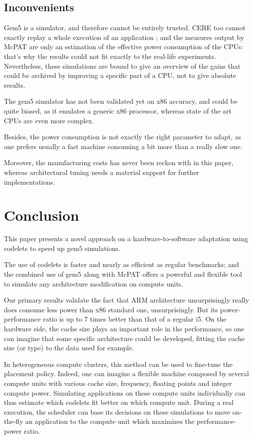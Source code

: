 \documentclass{article}
\begin{document}
\begin{multicols}{2}
\subsection{Inconvenients}
Gem5 is a simulator, and therefore cannot be entirely trusted. CERE too cannot exactly replay a whole execution of an application ; and the measures output by McPAT are only an estimation of the effective power consumption of the CPUs: that's why the results could not fit exactly to the real-life experiments. Nevertheless, these simulations are bound to give an overview of the gains that could be archived by improving a specific part of a CPU, not to give absolute results.

The gem5 simulator has not been validated yet on x86 accuracy, and could be quite biased, as it emulates a generic x86 processor, whereas state of the art CPUs are even more complex.

Besides, the power consumption is not exactly the right parameter to adapt, as one prefers usually a fast machine consuming a bit more than a really slow one.

Moreover, the manufacturing costs has never been reckon with in this paper, whereas architectural tuning needs a material support for further implementations. 


\section{Conclusion}
\label{ccl}
This paper presents a novel approach on a hardware-to-software adaptation using codelets to speed up gem5 simulations. 

The use of codelets is faster and nearly as efficient as regular benchmarks; and the combined use of gem5 along with McPAT offers a powerful and flexible tool to simulate any architecture modification on compute units.

Our primary results validate the fact that ARM architecture unsurprisingly really does consume less power than x86 standard one, unsurprisingly. But its power-performance ratio is up to 7 times better than that of a regular i5. On the hardware side, the cache size plays an important role in the performance, so one can imagine that some specific architecture could be developed, fitting the cache size (or type) to the data used for example.

In heterogeneous compute clusters, this method can be used to fine-tune the placement policy. Indeed, one can imagine a flexible machine composed by several compute units with various cache size, frequency, floating points and integer compute power. Simulating applications on these compute units individually can thus estimate which codelets fit better on which compute unit. During a real execution, the scheduler can base its decisions on these simulations to move on-the-fly an application to the compute unit which maximizes the performance-power ratio.



\end{multicols}
\end{document}

